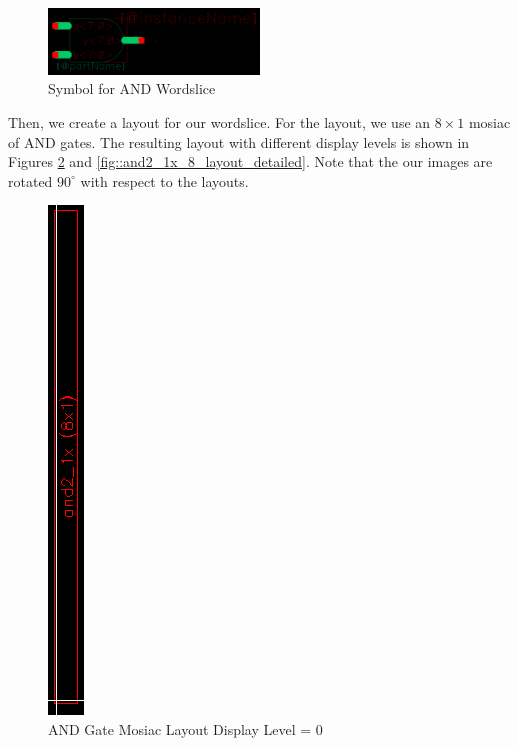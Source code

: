 \documentclass{article}
\begin{document}
	\begin{figure}[H]
		\centerline{\includegraphics[width=0.5\textwidth]{and2_1x_8_symbol.png}}
		\caption{Symbol for AND Wordslice}
		\label{fig::and2_1x_8_symbol}
	\end{figure}
	
	\noindent Then, we create a layout for our wordslice. For the layout, we use an $8 \times 1$ mosiac of AND gates. The resulting layout with different display levels is shown in Figures \ref{fig::and2_1x_8_layout_mosiac_overview} and \ref{fig::and2_1x_8_layout_detailed}. Note that the our images are rotated $90^{\circ}$ with respect to the layouts.  
	
	\begin{figure}[H]
		\centerline{\includegraphics[height=0.8\textwidth, angle=270]{and2_1x_8_layout_mosiac_overview.png}}
		\caption{AND Gate Mosiac Layout Display Level = 0}
		\label{fig::and2_1x_8_layout_mosiac_overview}
	\end{figure}
	
\end{document}
